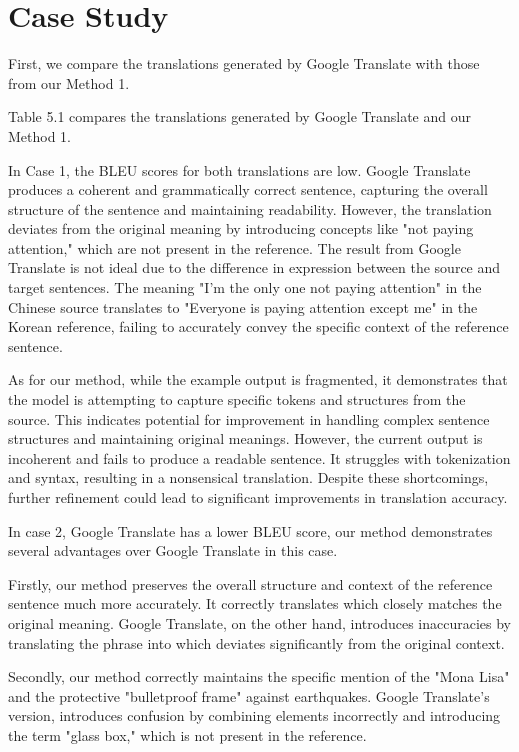 \documentclass[PhD]{PHlab-thesis}
\begin{document}
\section{Case Study}
First, we compare the translations generated by Google Translate with those from our Method 1. 

Table 5.1 compares the translations generated by Google Translate and our Method 1.

In Case 1, the BLEU scores for both translations are low. Google Translate produces a coherent and grammatically correct sentence, capturing the overall structure of the sentence and maintaining readability. However, the translation deviates from the original meaning by introducing concepts like "not paying attention," which are not present in the reference. The result from Google Translate is not ideal due to the difference in expression between the source and target sentences. The meaning "I'm the only one not paying attention" in the Chinese source translates to "Everyone is paying attention except me" in the Korean reference, failing to accurately convey the specific context of the reference sentence.

As for our method, while the example output is fragmented, it demonstrates that the model is attempting to capture specific tokens and structures from the source. This indicates potential for improvement in handling complex sentence structures and maintaining original meanings. However, the current output is incoherent and fails to produce a readable sentence. It struggles with tokenization and syntax, resulting in a nonsensical translation. Despite these shortcomings, further refinement could lead to significant improvements in translation accuracy.

In case 2, Google Translate has a lower BLEU score, our method demonstrates several advantages over Google Translate in this case.

Firstly, our method preserves the overall structure and context of the reference sentence much more accurately. It correctly translates  which closely matches the original meaning. Google Translate, on the other hand, introduces inaccuracies by translating the phrase into  which deviates significantly from the original context.

Secondly, our method correctly maintains the specific mention of the "Mona Lisa" and the protective "bulletproof frame" against earthquakes. Google Translate's version,  introduces confusion by combining elements incorrectly and introducing the term "glass box," which is not present in the reference.
\end{document}
